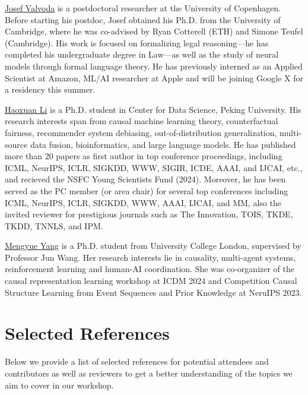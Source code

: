 \documentclass{article}
\begin{document}
\href{https://valvoda.github.io/}{Josef Valvoda} is a postdoctoral researcher at the University of Copenhagen. 
Before starting his postdoc, Josef obtained his Ph.D. from the University of Cambridge, where he was co-advised by Ryan Cotterell (ETH) and Simone Teufel (Cambridge).
His work is focused on formalizing legal reasoning---he has completed his undergraduate degree in Law---as well as the study of neural models through formal language theory.
He has previously interned as an Applied Scientist at Amazon, ML/AI researcher at Apple and will be joining Google X for a residency this summer.

\href{https://scholar.google.com/citations?user=gtDqiucAAAAJ&hl=en}{Haoxuan Li} is a Ph.D. student in Center for Data Science, Peking University. His research interests span from causal machine learning theory, counterfactual fairness, recommender system debiasing, out-of-distribution generalization, multi-source data fusion, bioinformatics, and large language models. He has published more than 20 papers as first author in top conference
proceedings, including ICML, NeurIPS, ICLR, SIGKDD, WWW, SIGIR, ICDE, AAAI, and IJCAI, etc., and recieved the NSFC Young Scientists Fund (2024). Moreover, he has been served as the PC member (or area chair) for several top conferences including ICML, NeurIPS, ICLR, SIGKDD, WWW, AAAI, IJCAI, and MM, also the invited reviewer for prestigious journals such as The Innovation, TOIS, TKDE, TKDD, TNNLS, and IPM.

\href{https://ymy4323460.github.io/}{Mengyue Yang} is a Ph.D. student from University College London, supervised by Professor Jun Wang. Her research interests lie in causality, multi-agent systems, reinforcement learning and human-AI coordination. She was co-organizer of the causal representation learning workshop at ICDM 2024 and Competition Causal Structure Learning from Event Sequences and Prior Knowledge at NeruIPS 2023.




\section{Selected References}

Below we provide a list of selected references for potential attendees and contributors as well as reviewers to get a better understanding of the topics we aim to cover in our workshop. 
\end{document}
